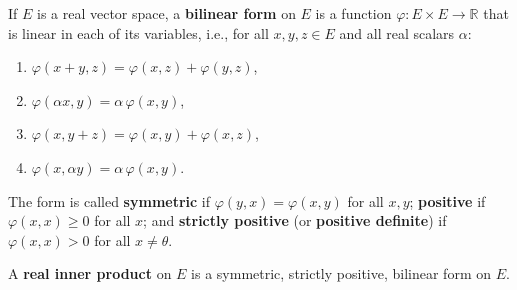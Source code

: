 If $E$ is a real vector space, a \textbf{bilinear form} on $E$ is a function $\varphi \colon E \times E \to \mathbb{R}$ that is linear in each of its variables, i.e., for all $x, y, z \in E$ and all real scalars $\alpha$:

\begin{enumerate}
\item[(i)] $\varphi(x + y, z) = \varphi(x, z) + \varphi(y, z)$,
\item[(ii)] $\varphi(\alpha x, y) = \alpha\,\varphi(x, y)$,
\item[(iii)] $\varphi(x, y + z) = \varphi(x, y) + \varphi(x, z)$,
\item[(iv)] $\varphi(x, \alpha y) = \alpha\,\varphi(x, y)$.
\end{enumerate}

The form is called \textbf{symmetric} if $\varphi(y, x) = \varphi(x, y)$ for all $x, y$; \textbf{positive} if $\varphi(x, x) \geq 0$ for all $x$; and \textbf{strictly positive} (or \textbf{positive definite}) if $\varphi(x, x) > 0$ for all $x \neq \theta$.

A \textbf{real inner product} on $E$ is a symmetric, strictly positive, bilinear form on $E$.
